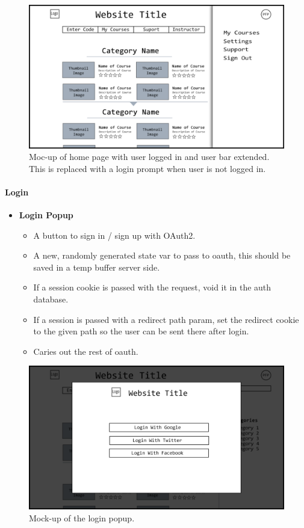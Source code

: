 \documentclass{article}
\begin{document}
\begin{figure}[h!]
    \caption{Moc-up of home page with user logged in and user bar extended.
    This is replaced with a login prompt when user is not logged in.}
    \includegraphics[width=\textwidth]{user_side_bar}
\end{figure}

\newpage

\paragraph{Login}

\vspace{\baselineskip}
\begin{itemize}
    \item \textbf{Login Popup}
    \begin{itemize}
        \item A button to sign in / sign up with OAuth2.
        \item A new, randomly generated state var to pass to oauth, this should
            be saved in a temp buffer server side.
        \item If a session cookie is passed with the request, void it in the
            auth database.
        \item If a session is passed with a redirect path param, set the
            redirect cookie to the given path so the user can be sent there
            after login.
        \item Caries out the rest of oauth.
    \end{itemize}
\end{itemize}
\begin{figure}[h!]
    \caption{Mock-up of the login popup.}
    \includegraphics[width=\textwidth]{login}
\end{figure}
\end{document}

